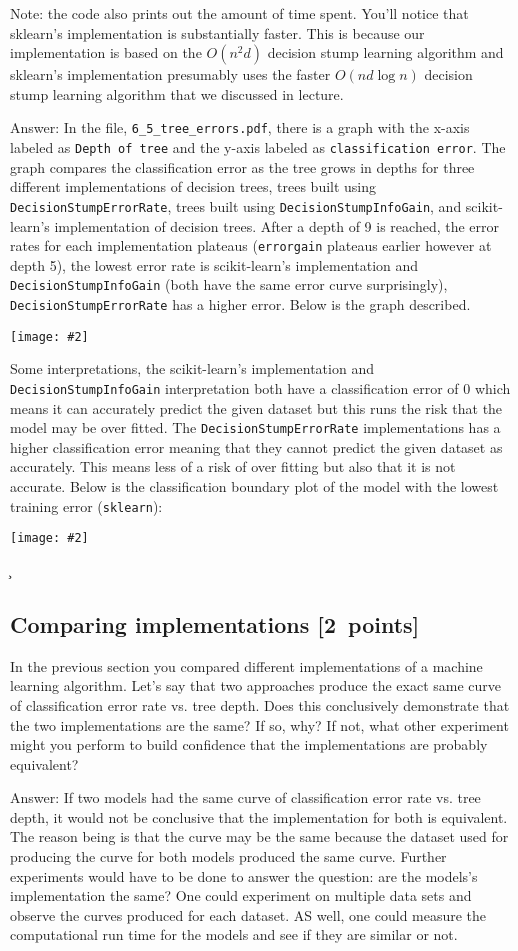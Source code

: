 \documentclass{article}
\newcommand{\gre}[1]{\textcolor{gre}{#1}}
\newcommand\ans[1]{\par\gre{Answer: #1}}
\newcommand\pts[1]{\textcolor{pointscolour}{[#1~points]}}
\newcommand{\centerfig}[2]{\begin{center}\texttt{[image: \#2]}\end{center}}
\begin{document}
  Note: the code also prints out the amount of time spent. You'll notice that sklearn's implementation is substantially faster. This is because
  our implementation is based on the $O(n^2d)$ decision stump learning algorithm and sklearn's implementation presumably uses the faster $O(nd\log n)$
  decision stump learning algorithm that we discussed in lecture.
  \ans{ \newline In the file, \texttt{6\_5\_tree\_errors.pdf}, there is a graph with the x-axis labeled as \texttt{Depth of tree} and the y-axis labeled as \texttt{classification error}. The graph compares the classification error as the tree grows in depths for three different implementations of decision trees, trees built using \texttt{DecisionStumpErrorRate}, trees built using \texttt{DecisionStumpInfoGain}, and scikit-learn's implementation of decision trees. After a depth of 9 is reached, the error rates for each implementation plateaus (\texttt{errorgain} plateaus earlier however at depth 5), the lowest error rate is scikit-learn's implementation and \texttt{DecisionStumpInfoGain} (both have the same error curve surprisingly), \texttt{DecisionStumpErrorRate} has a higher error. Below is the graph described.\centerfig{0.7}{./figs/q6_5_tree_errors}Some interpretations, the scikit-learn's implementation and \texttt{DecisionStumpInfoGain} interpretation both have a classification error of 0 which means it can accurately predict the given dataset but this runs the risk that the model may be over fitted. The \texttt{DecisionStumpErrorRate} implementations has a higher classification error meaning that they cannot predict the given dataset as accurately. This means less of a risk of over fitting but also that it is not accurate. Below is the classification boundary plot of the model with the lowest training error (\texttt{sklearn}):\centerfig{0.7}{./figs/q6_5_decisionBoundary}}\c

  
  \newpage

  \subsection{Comparing implementations \pts{2}}

  In the previous section you compared different implementations of a machine learning algorithm. Let's say that two
  approaches produce the exact same curve of classification error rate vs. tree depth. Does this conclusively demonstrate
  that the two implementations are the same? If so, why? If not, what other experiment might you perform to build confidence
  that the implementations are probably equivalent?
  
  \ans{  \newline
  If two models had the same curve of classification error rate vs. tree depth, it would not be conclusive that the implementation for both is equivalent. The reason being is that the curve may be the same because the dataset used for producing the curve for both models produced the same curve. Further experiments would have to be done to answer the question: are the models's implementation the same? One could experiment on multiple data sets and observe the curves produced for each dataset. AS well, one could measure the computational run time for the models and see if they are similar or not. 
}
\end{document}
